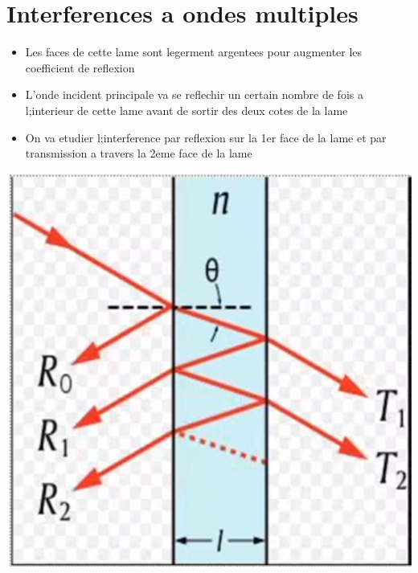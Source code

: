 \documentclass[12pt]{book}
\begin{document}
        \section{Interferences a ondes multiples }    
            \begin{center}
                \begin{minipage}{0.7\linewidth}
                    \begin{itemize}
                        \item Les faces de cette lame sont legerment argentees pour augmenter les coefficient de reflexion 
                        \item L'onde incident principale va se reflechir un certain nombre de fois a l;interieur de cette lame avant de sortir des deux cotes de la lame 
                        \item On va etudier l;interference  par reflexion sur la 1er face de la lame et par transmission a travers la 2eme face de la lame
                    \end{itemize}
                \end{minipage}
                \begin{minipage}{0.29\linewidth}
                    \includegraphics[width=\linewidth]{pic/interferencesaondesmultiples.png}
                \end{minipage}
            \end{center}
\end{document}
